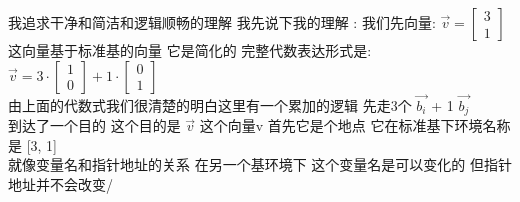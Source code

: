 \documentclass[12pt]{article}
\begin{document}
\begin{flushleft}
    我追求干净和简洁和逻辑顺畅的理解 我先说下我的理解 :
    我们先向量:
    $\vec{v} = \begin{bmatrix}
            3 \\
            1
        \end{bmatrix}$ \\
    这向量基于标准基的向量 它是简化的 完整代数表达形式是: \\
    $\vec{v} = 3 \cdot \begin{bmatrix}
            1 \\
            0
        \end{bmatrix} + 1 \cdot \begin{bmatrix}
            0 \\
            1
        \end{bmatrix}$ \\
    由上面的代数式我们很清楚的明白这里有一个累加的逻辑 先走3个 $\vec{b_i}$ + 1 $\vec{b_j}$ \\
    到达了一个目的 这个目的是 $\vec{v}$ 这个向量v 首先它是个地点 它在标准基下环境名称是 [3, 1] \\
    就像变量名和指针地址的关系 在另一个基环境下 这个变量名是可以变化的 但指针地址并不会改变/ \\


\end{flushleft}
\end{document}
